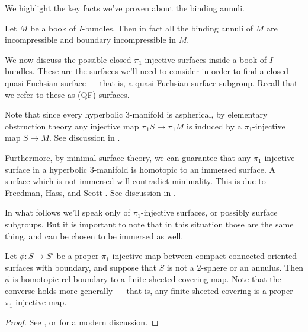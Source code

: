 We highlight the key facts we've proven about the binding annuli.

\begin{cor}

Let $M$ be a book of $I$-bundles. Then in fact all the binding annuli of $M$
are incompressible and boundary incompressible in $M$.

\end{cor}

We now discuss the possible closed $\pi_1$-injective surfaces inside a book of
$I$-bundles. These are the surfaces we'll need to consider in order to find
a closed quasi-Fuchsian surface --- that is, a quasi-Fuchsian surface subgroup.
Recall that we refer to these as (QF) surfaces.

Note that since every hyperbolic $3$-manifold is aspherical, by elementary
obstruction theory any injective map $\pi_1S \to \pi_1M$ is induced by
a $\pi_1$-injective map $S \to M$. See discussion in \cite[Section 1.1]{LR}.

Furthermore, by minimal surface theory, we can guarantee that any
$\pi_1$-injective surface in a hyperbolic $3$-manifold is homotopic to an
immersed surface.  A surface which is not immersed will contradict minimality.
This is due to Freedman, Hass, and Scott \cite{FreedmanHassScott}. See
discussion in \cite[Section 1]{Neu}.

In what follows we'll speak only of $\pi_1$-injective surfaces, or possibly
surface subgroups. But it is important to note that in this situation those are
the same thing, and can be chosen to be immersed as well.

\begin{lemma}\label{L:covering}

Let $\phi\colon S \to S'$ be a proper $\pi_1$-injective map between compact
connected oriented surfaces with boundary, and suppose that $S$ is not
a 2-sphere or an annulus.  Then $\phi$ is homotopic rel boundary to
a finite-sheeted covering map.  Note that the converse holds more generally ---
that is, any finite-sheeted covering is a proper $\pi_1$-injective map.

\end{lemma}

\begin{proof}

See \cite{Nielsen}, or \cite{GabaiKazez} for a modern discussion.

\end{proof}

